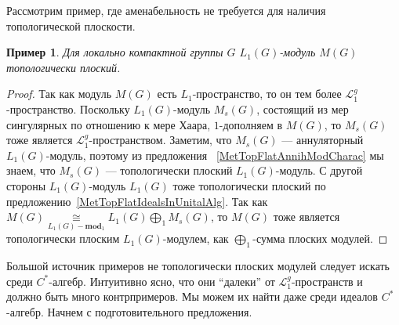 \documentclass[12pt]{article}
\newtheorem{example}[theorem]{Пример}
\newcommand{\isom}[1]{\mathop{\mathbin{\cong}}\limits_{#1}}
\begin{document}
Рассмотрим пример, где аменабельность не требуется для наличия топологической
плоскости.

\begin{example} Для локально компактной группы $G$ $L_1(G)$-модуль $M(G)$
топологически плоский.
\end{example}
\begin{proof}
Так как модуль $M(G)$ есть $L_1$-пространство, то он тем более
$\mathcal{L}_1^g$-пространство. Поскольку $L_1(G)$-модуль $M_s(G)$, состоящий из
мер сингулярных по отношению к мере Хаара, $1$-дополняем в $M(G)$, то $M_s(G)$
тоже является $\mathcal{L}_1^g$-пространством. Заметим, что $M_s(G)$ ---
аннуляторный $L_1(G)$-модуль, поэтому из предложения
~\ref{MetTopFlatAnnihModCharac} мы знаем, что $M_s(G)$ --- топологически плоский
$L_1(G)$-модуль. С другой стороны $L_1(G)$-модуль $L_1(G)$ тоже топологически
плоский по предложению~\ref{MetTopFlatIdealsInUnitalAlg}. Так как
$M(G)\isom{L_1(G)-\mathbf{mod}_1}L_1(G)\bigoplus_1 M_s(G)$, то $M(G)$ тоже
является топологически плоским $L_1(G)$-модулем, как  $\bigoplus_1$-сумма
плоских модулей.
\end{proof}

Большой источник примеров не топологически плоских модулей следует искать среди
$C^*$-алгебр. Интуитивно ясно, что они ``далеки'' от
$\mathcal{L}_1^g$-пространств и должно быть много контрпримеров. Мы можем их
найти даже среди идеалов $C^*$-алгебр. Начнем с подготовительного предложения.
\end{document}
